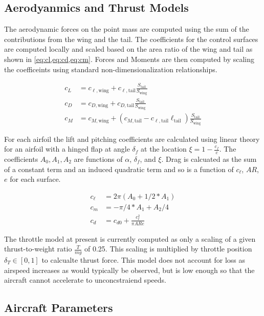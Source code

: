 \documentclass{article}
\begin{document}
\subsection{Aerodyanmics and Thrust Models}

The aerodynamic forces on the point mass are computed using the sum of the contributions from the wing and the tail. The coefficients for the control surfaces are computed locally and scaled based on the area ratio of the wing and tail as shown in  \cref{eq:cl,eq:cd,eq:cm}. Forces and Moments are then computed by scaling the coefficeints using standard non-dimensionalization relationships.

\begin{align}
	c_L &= c_{\ell,\mathrm{wing}} + c_{\ell,\mathrm{tail}} \frac{S_\mathrm{tail}}{S_\mathrm{wing}} \label{eq:cl}\\
	c_D &= c_{D,\mathrm{wing}} + c_{D,\mathrm{tail}}\frac{S_\mathrm{tail}}{S_\mathrm{wing}} \label{eq:cd}\\
	c_M &= c_{M,\mathrm{wing}} + \left( c_{M,\mathrm{tail}} - c_{\ell,\mathrm{tail}} \ell_\mathrm{tail} \right) \frac{S_\mathrm{tail}}{S_\mathrm{wing}} \label{eq:cm}
\end{align}

For each airfoil the lift and pitching coefficients are calculated using linear theory for an airfoil with a hinged flap at angle $\delta_f$ at the location $\xi = 1-\frac{c_f}{c}$. The coefficients $A_0,A_1,A_2$ are functions of $\alpha$, $\delta_f$, and $\xi$. Drag is calcuated as the sum of a constant term and an induced quadratic term and so is a function of $c_\ell$, $AR$, $e$ for each surface.

\begin{align}
	c_\ell &= 2\pi (A_0 + 1/2*A_1) \\
	c_m &= -\pi/4*A_1 + A_2/4\\
	c_d &= c_{d0} + \frac{c_\ell^2}{\pi AR e}
\end{align}

The throttle model at present is currently computed as only a scaling of a given thrust-to-weight ratio $\frac{T}{mg}$ of 0.25. 
This scaling is multiplied by throttle position $\delta_T \in [0,1]$ to calcualte thrust force. 
This model does not account for loss as airspeed increases as would typically be observed, but is low enough so that the aircraft cannot accelerate to unconcstraiend speeds. \\

\subsection{Aircraft Parameters}
\end{document}
